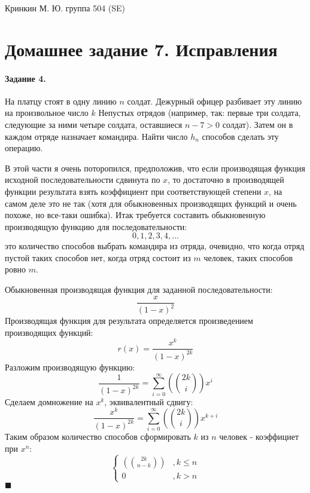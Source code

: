 \documentclass[a4paper,12pt]{article}
\begin{document}
\sloppy

\lstset{
	basicstyle=\small,
	stringstyle=\ttfamily,
	showstringspaces=false,
	columns=fixed,
	breaklines=true,
	numbers=right,
	numberstyle=\tiny
}

\newtheorem{Def}{Определение}[section]
\newtheorem{Th}{Теорема}
\newtheorem{Lem}[Th]{Лемма}
\newenvironment{Proof}
	{\par\noindent{\bf Доказательство.}}
	{\hfill$\scriptstyle\blacksquare$}
\newenvironment{Solution}
	{\par\noindent{\bf Решение.}}
	{\hfill$\scriptstyle\blacksquare$}


\begin{flushright}
	Кринкин М. Ю. группа 504 (SE)
\end{flushright}

\section{Домашнее задание 7. Исправления}

\paragraph{Задание 4.} На платцу стоят в одну линию $n$ солдат. Дежурный офицер разбивает эту линию на произвольное число $k$ Непустых отрядов (например, так: первые три солдата, следующие за ними четыре солдата, оставшиеся $n-7>0$ солдат). Затем он в каждом отряде назначает командира. Найти число $h_n$ способов сделать эту операцию.

\begin{Solution}
В этой части я очень поторопился, предположив, что если производящая функция исходной последовательности сдвинута по $x$, то достаточно в производящей функции результата взять коэффициент при соответствующей степени $x$, на самом деле это не так (хотя для обыкновенных производящих функций и очень похоже, но все-таки ошибка).
Итак требуется составить обыкновенную производящую функцию для последовательности:
\[
	0, 1, 2, 3, 4, ...
\]
это количество способов выбрать командира из отряда, очевидно, что когда отряд пустой таких способов нет, когда отряд состоит из $m$ человек, таких способов ровно $m$.

Обыкновенная производящая функция для заданной последовательности:
\[
	\frac{x}{\left(1-x\right)^2}
\]
Производящая функция для результата определяется произведением производящих функций:
\[
	r\left(x\right) = \frac{x^k}{\left(1-x\right)^{2k}}
\]
Разложим производящую функцию:
\[
	\frac{1}{\left(1-x\right)^{2k}} = \sum_{i=0}^{\infty} \left(\binom{2k}{i}\right) x^i
\]
Сделаем домножение на $x^k$, эквивалентный сдвигу:
\[
	\frac{x^k}{\left(1-x\right)^{2k}} = \sum_{i=0}^{\infty} \left(\binom{2k}{i}\right) x^{k+i}
\]
Таким образом количество способов сформировать $k$ из $n$ человек - коэффициет при $x^n$:
\[
	\begin{cases}
		\left(\binom{2k}{n-k}\right) & , k \le n \\
		0 & , k > n
	\end{cases}
\]
\end{Solution}
\end{document}
